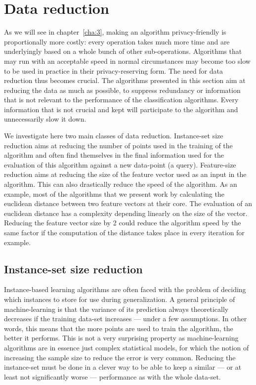 \section{Data reduction}
As we will see in chapter~\ref{cha:3}, making an algorithm privacy-friendly is proportionally more costly: every operation takes much more time and are underlyingly based on a whole bunch of other sub-operations. Algorithms that may run with an acceptable speed in normal circumstances may become too slow to be used in practice in their privacy-reserving form. The need for data reduction thus becomes crucial. The algorithms presented in this section aim at reducing the data as much as possible, to suppress redundancy or information that is not relevant to the performance of the classification algorithms. Every information that is not crucial and kept will participate to the algorithm and unnecessarily slow it down.

We investigate here two main classes of data reduction. Instance-set size reduction aims at reducing the number of points used in the training of the algorithm and often find themselves in the final information used for the evaluation of this algorithm against a new data-point (a query). Feature-size reduction aims at reducing the size of the feature vector used as an input in the algorithm. This can also drastically reduce the speed of the algorithm. As an example, most of the algorithms that we present work by calculating the euclidean distance between two feature vectors at their core. The evaluation of an euclidean distance has a complexity depending linearly on the size of the vector. Reducing the feature vector size by 2 could reduce the algorithm speed by the same factor if the computation of the distance takes place in every iteration for example.

\subsection{Instance-set size reduction}
Instance-based learning algorithms are often faced with the problem of deciding which instances to store for use during generalization. A general principle of machine-learning is that the variance of its prediction always theoretically decreases if the training data-set increases --- under a few assumptions. In other words, this means that the more points are used to train the algorithm, the better it performs. This is not a very surprising property as machine-learning algorithms are in essence just complex statistical models, for which the notion of increasing the sample size to reduce the error is very common. Reducing the instance-set must be done in a clever way to be able to keep a similar --- or at least not significantly worse --- performance as with the whole data-set.  

